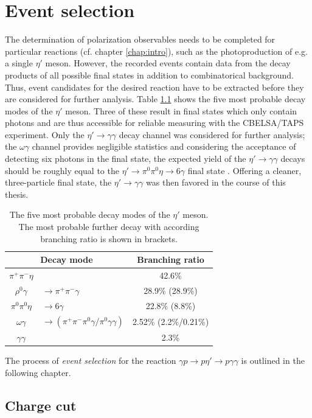 \chapter{Event selection}
The determination of polarization observables needs to be completed for particular reactions (cf. chapter \ref{chap:intro}), such as the photoproduction of e.g. a single $\eta'$ meson. However, the recorded events  contain data from the decay products of all possible final states in addition to combinatorical background. Thus, event candidates for the desired reaction have to be extracted before they are considered for further analysis. Table \ref{tab:etap} shows the five most probable decay modes of the $\eta'$ meson. Three of these result in final states which only contain photons and are thus accessible for reliable measuring with the CBELSA/TAPS experiment. Only the $\eta'\to\gamma\gamma$ decay channel was considered for further analysis; the $\omega\gamma$ channel provides negligible statistics and considering the acceptance of detecting six photons in the final state, the expected yield of the $\eta'\to\gamma\gamma$ decays should be roughly equal to the $\eta'\to\pi^0\pi^0\eta\to6\gamma$ final state \cite{farah}. Offering a cleaner, three-particle final state, the $\eta'\to\gamma\gamma$ was then favored in the course of this thesis.      
\begin{table}[htbp]
	\centering
	\begin{tabular}{clc}
		\toprule
		\multicolumn{2}{c}{Decay mode}&Branching ratio\\
		\hline
		$\pi^+\pi^-\eta$&&42.6\%\\
		$\rho^0\gamma$&$\to\pi^+\pi^-\gamma$ &28.9\% (28.9\%)\\
	$\pi^0\pi^0\eta$&$\to6\gamma$ & 22.8\% (8.8\%)\\
		$\omega\gamma$ &$\to (\pi^+\pi^-\pi^0\gamma/\pi^0\gamma\gamma)$&2.52\% (2.2\%/0.21\%)\\
	$\gamma\gamma$&&2.3\%\\

		\bottomrule
	\end{tabular}
\caption{The five most probable decay modes of the $\eta'$ meson. The most probable further decay with according branching ratio is shown in brackets.\cite{pdg}}
\label{tab:etap}
\end{table}
The process of \emph{event selection} for the reaction $\gamma p \to p\eta'\to p\gamma\gamma$ is outlined in the following chapter.

\section{Charge cut}

